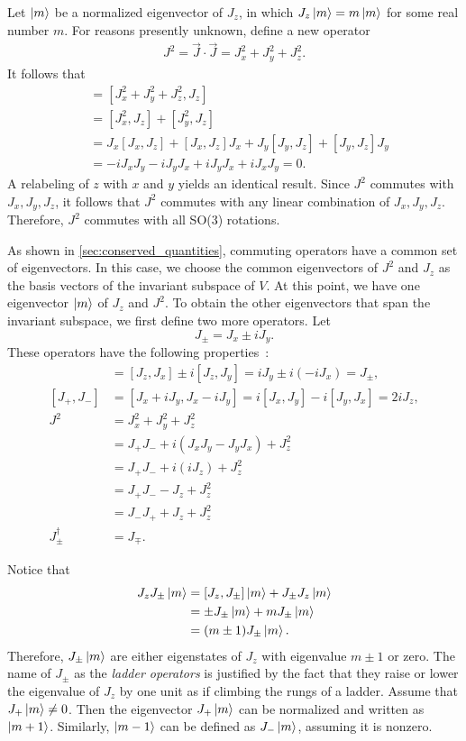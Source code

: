Let $\ket{m}$ be a normalized eigenvector of $J_z$, in which $J_z\ket{m} = m\ket{m}$ for some real number $m$. For reasons presently unknown, define a new operator
\begin{align*}
    J^2 = \vec{J}\cdot\vec{J} = J_x^2 + J_y^2 + J_z^2.
\end{align*}
It follows that
\begin{align*}
    [J^2,J_z] 
        &= [J_x^2 + J_y^2 + J_z^2, J_z] \\
        &= [J_x^2,J_z] + [J_y^2,J_z] \\
        &= J_x [J_x,J_z] + [J_x,J_z]J_x + J_y [J_y,J_z] + [J_y,J_z]J_y \\
        &= -i J_x J_y -i J_y J_x + i J_y J_x + i J_x J_y = 0.
\end{align*}
A relabeling of $z$ with $x$ and $y$ yields an identical result. Since $J^2$ commutes with $J_x,J_y,J_z$, it follows that $J^2$ commutes with any linear combination of $J_x,J_y,J_z$. Therefore, $J^2$ commutes with all SO(3) rotations.

As shown in \cref{sec:conserved_quantities}, commuting operators have a common set of eigenvectors. In this case, we choose the common eigenvectors of $J^2$ and $J_z$ as the basis vectors of the invariant subspace of $V$. At this point, we have one eigenvector $\ket{m}$ of $J_z$ and $J^2$. To obtain the other eigenvectors that span the invariant subspace, we first define two more operators. Let
\begin{equation}
    J_\pm = J_x \pm i J_y.
\end{equation}
These operators have the following properties~\cite{Tung1985,Griffiths2018,Hall2013}:
\begin{align*}
    [J_z, J_\pm] &= [J_z, J_x] \pm i[J_z, J_y] = i J_y \pm i(-i J_x) = J_\pm, \\
    [J_+, J_-] &= [J_x + i J_y, J_x - i J_y] = i[J_x, J_y] - i[J_y, J_x] = 2i J_z, \\
    J^2 
        &=  J_x^2 + J_y^2 + J_z^2 \\
        &=  J_+ J_- + i(J_x J_y - J_y J_x) + J_z^2 \\
        &=  J_+ J_- + i(i J_z) + J_z^2 \\
        &= J_+ J_- - J_z + J_z^2 \\
        &= J_- J_+ + J_z + J_z^2 \\
    J_\pm^\dagger &= J_\mp.
\end{align*}

Notice that
\begin{align*}
    J_z J_\pm\ket{m} &= [J_z,J_\pm]\ket{m} + J_\pm J_z\ket{m} \\
    &= \pm J_\pm\ket{m} + m J_\pm\ket{m} \\
    &= (m\pm 1)J_\pm\ket{m}.
\end{align*}
Therefore, $J_\pm\ket{m}$ are either eigenstates of $J_z$ with eigenvalue $m\pm 1$ or zero. The name of $J_\pm$ as the \textit{ladder operators} is justified by the fact that they raise or lower the eigenvalue of $J_z$ by one unit as if climbing the rungs of a ladder. Assume that $J_+\ket{m}\neq 0$. Then the eigenvector $J_+\ket{m}$ can be normalized and written as $\ket{m+1}$. Similarly, $\ket{m-1}$ can be defined as $J_-\ket{m}$, assuming it is nonzero.

